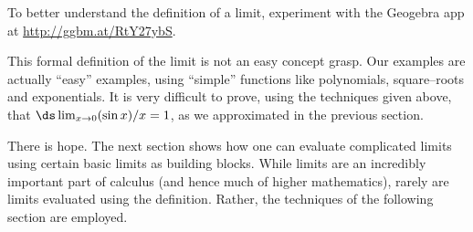 %
%

To better understand the definition of a limit, experiment with the Geogebra app
at \url{http://ggbm.at/RtY27ybS}.



This formal definition of the limit is not an easy concept grasp. Our examples are actually ``easy'' examples, using ``simple'' functions like polynomials, square--roots and exponentials. It is very difficult to prove, using the techniques given above, that $\ds \lim_{x\to 0}(\sin x)/x = 1$, as we approximated in the previous section.

There is hope. The next section shows how one can evaluate complicated limits using certain basic limits as building blocks. While limits are an incredibly important part of calculus (and hence much of higher mathematics), rarely are limits evaluated using the definition. Rather, the techniques of the following section are employed.

